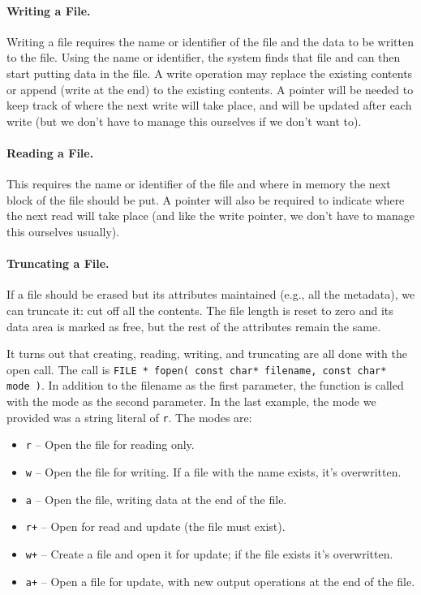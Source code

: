 \paragraph{Writing a File.} Writing a file requires the name or identifier of the file and the data to be written to the file. Using the name or identifier, the system finds that file and can then start putting data in the file. A write operation may replace the existing contents or append (write at the end) to the existing contents. A pointer will be needed to keep track of where the next write will take place, and will be updated after each write (but we don't have to manage this ourselves if we don't want to).

\paragraph{Reading a File.} This requires the name or identifier of the file and where in memory the next block of the file should be put. A pointer will also be required to indicate where the next read will take place (and like the write pointer, we don't have to manage this ourselves usually).

\paragraph{Truncating a File.} If a file should be erased but its attributes maintained (e.g., all the metadata), we can truncate it: cut off all the contents. The file length is reset to zero and its data area is marked as free, but the rest of the attributes remain the same.


It turns out that creating, reading, writing, and truncating are all done with the open call. The call is \texttt{FILE * fopen( const char* filename, const char* mode )}. In addition to the filename as the first parameter, the function is called with the mode as the second parameter. In the last example, the mode we provided was a string literal of \texttt{r}. The modes are:

\begin{itemize}
	\item \texttt{r} -- Open the file for reading only.
	\item \texttt{w} -- Open the file for writing. If a file with the name exists, it's overwritten.
	\item \texttt{a} -- Open the file, writing data at the end of the file.
	\item \texttt{r+} -- Open for read and update (the file must exist).
	\item \texttt{w+} -- Create a file and open it for update; if the file exists it's overwritten.
	\item \texttt{a+} -- Open a file for update, with new output operations at the end of the file.
\end{itemize}

